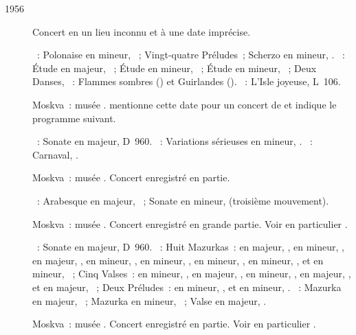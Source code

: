 \begin{description}
 \item[1956]
 Concert en un lieu inconnu et à une date imprécise.

 \textsc{\Chopin{}}~: Polonaise en \kC \Sharp mineur,  ~;
 Vingt-quatre Préludes~; Scherzo en \kB mineur, .
 \textsc{\Scriabine{}}~: Étude en \kB majeur,  ~; Étude en
 \kB \Flat mineur,  ~; Étude en \kB \Flat mineur, 
 ~; Deux Danses, ~: Flammes sombres () et
 Guirlandes ().
 \textsc{\Debussy{}}~: L'\hbox{Isle} joyeuse, L~106.
 \item[]
 Moskva~: musée \Scriabine{}.
 \citet[p.~179]{Nekrasova08} mentionne cette date pour un concert de
 \VSofronitsky{} et indique le programme suivant.

 \textsc{\Schubert{}}~: Sonate en \kB \Flat majeur, D~960.
 \textsc{\Mendelssohn{}}~: Variations sérieuses en \kD mineur, .
 \textsc{\Schumann{}}~: Carnaval, .
 \item[]
 Moskva~: musée \Scriabine{}.
 Concert enregistré en partie.

 \textsc{\Schumann{}}~: Arabesque en \kC majeur, ~; Sonate en \kF
 mineur,  (troisième mouvement).
 \item[]
 Moskva~: musée \Scriabine{}.
 Concert enregistré en grande partie.
 Voir en particulier \citet[p.~449]{Milshteyn82a}.

 \textsc{\Schubert{}}~: Sonate en \kB \Flat majeur, D~960.
 \textsc{\Chopin{}}~: Huit Mazurkas~: en \kD \Flat majeur, 
 , en \kC \Sharp mineur,  , en \kC majeur,
  , en \kB mineur,  , en \kC \Sharp
 mineur,  , en \kE mineur,  , en \kC
 \Sharp mineur,  , et en \kF mineur, 
 ~; Cinq Valses~: en \kB mineur,  , en \kG \Flat
 majeur,  , en \kF mineur,  , en \kD
 \Flat majeur,  , et en \kD \Flat majeur, 
 ~; Deux Préludes~: en \kB \Flat mineur,  , et
 en \kF mineur,  .
 \textsc{\Scriabine{}}~: Mazurka en \kF \Sharp majeur, 
 ~; Mazurka en \kE mineur,  ~; Valse en \kA
 \Flat majeur, .
 \item[]
 Moskva~: musée \Scriabine{}.
 Concert enregistré en partie.
 Voir en particulier \citet[p.~449]{Milshteyn82a}.


\end{description}
